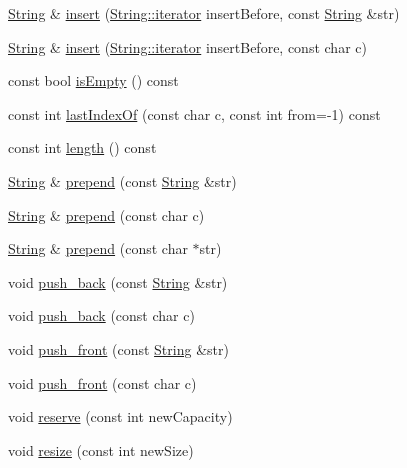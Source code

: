 \begin{DoxyCompactItemize}
\hyperlink{classprism_1_1_string}{String} \& \hyperlink{classprism_1_1_string_ae21a3ae6bcf4bd889a4994fead75188c}{insert} (\hyperlink{classprism_1_1_string_adacc7975837e5fff95d70690777fb330}{String\+::iterator} insert\+Before, const \hyperlink{classprism_1_1_string}{String} \&str)
\item 
\hyperlink{classprism_1_1_string}{String} \& \hyperlink{classprism_1_1_string_ac9d7c3aa36ad7a33ba9f13a00456beec}{insert} (\hyperlink{classprism_1_1_string_adacc7975837e5fff95d70690777fb330}{String\+::iterator} insert\+Before, const char c)
\item 
const bool \hyperlink{classprism_1_1_string_a2f2960f59d644b2d0f390a090fa7a4ef}{is\+Empty} () const 
\item 
const int \hyperlink{classprism_1_1_string_a94a9059dc86dcfcbf409ffc83f3da2a8}{last\+Index\+Of} (const char c, const int from=-\/1) const 
\item 
const int \hyperlink{classprism_1_1_string_a7dfc72427863cefb9fe883599272ca7d}{length} () const 
\item 
\hyperlink{classprism_1_1_string}{String} \& \hyperlink{classprism_1_1_string_a0deb77daa45d88136d39b9960075cdb5}{prepend} (const \hyperlink{classprism_1_1_string}{String} \&str)
\item 
\hyperlink{classprism_1_1_string}{String} \& \hyperlink{classprism_1_1_string_a8f670c0ad0c7c00cdb89170f4b2275b3}{prepend} (const char c)
\item 
\hyperlink{classprism_1_1_string}{String} \& \hyperlink{classprism_1_1_string_a91f28e14e3febf379ff47a3bda12adab}{prepend} (const char $\ast$str)
\item 
void \hyperlink{classprism_1_1_string_a8e1459833ede719cd6b01ab5ce15d2e5}{push\+\_\+back} (const \hyperlink{classprism_1_1_string}{String} \&str)
\item 
void \hyperlink{classprism_1_1_string_a81b6a39be2a985ea02c46a4d1490755c}{push\+\_\+back} (const char c)
\item 
void \hyperlink{classprism_1_1_string_aadab394ea2370e2d23fcf932d373dcd3}{push\+\_\+front} (const \hyperlink{classprism_1_1_string}{String} \&str)
\item 
void \hyperlink{classprism_1_1_string_a5471ead67f8901cbed6bd43ef9f4a618}{push\+\_\+front} (const char c)
\item 
void \hyperlink{classprism_1_1_string_aed752cc8c9e59a7b2366b85ab20a656b}{reserve} (const int new\+Capacity)
\item 
void \hyperlink{classprism_1_1_string_a77b3580eba01007afc7089cfd334abd5}{resize} (const int new\+Size)

\end{DoxyCompactItemize}
